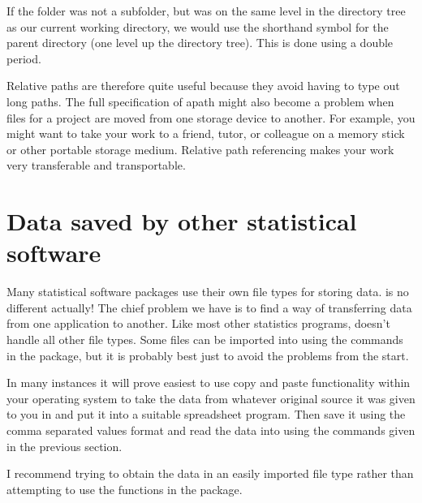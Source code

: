 If the  folder was not a subfolder, but was on the same level in the directory tree as our current working directory, we would use the shorthand symbol for the parent directory (one level up the directory tree). This is done using  a double period. 
\begin{knitrout}
\color{fgcolor}\begin{kframe}
\begin{alltt}
\hlstd{> } \hlkwb{=} \hlstd{(}\hlstd{)}
\end{alltt}
\end{kframe}
\end{knitrout}
 
Relative paths are therefore quite useful because they avoid having to type out long paths. The full specification of apath might also become a problem when files for a project are moved from one storage device to another. For example, you might want to take your work to a friend, tutor, or colleague on a  memory stick or other portable storage medium. Relative path referencing makes your work very transferable and transportable. 
 
 
 
 
 
 
\section{Data saved by other statistical software} 
 
Many statistical software packages use their own file types for storing data. \R{} is no different actually! The chief problem we have is to find a way of transferring data from one application to another. Like most other statistics programs, \R{} doesn't handle all other file types. Some files can be imported into \R{} using the commands in the  package, but it is probably best just to avoid the problems from the start. 
 
In many instances it will prove easiest to use copy and paste functionality within your operating system to take the data from whatever original source it was given to you in and put it into a suitable spreadsheet program. Then save it using the comma separated values format and read the data into \R{} using the commands given in the previous section. 
 
I recommend trying to obtain the data in an easily imported file type rather than attempting to use the functions in the  package. 
 
